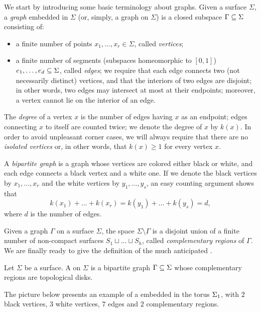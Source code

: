 We start by introducing some basic terminology about graphs. Given a surface $\Sigma$, a \emph{graph} embedded in $\Sigma$ (or, simply, a graph on $\Sigma$) is a closed subspace $\Gamma\subseteq\Sigma$ consisting of:
\begin{itemize}
\item a finite number of points $x_1,\ldots,x_r\in\Sigma$, called \emph{vertices};
\item a finite number of segments (subspaces homeomorphic to $[0,1]$) $e_1,\ldots,e_d\subseteq\Sigma$, called \emph{edges}; we require that each edge connects two (not necessarily distinct) vertices, and that the interiors of two edges are disjoint; in other words, two edges may intersect at most at their endpoints; moreover, a vertex cannot lie on the interior of an edge.
\end{itemize}
The \emph{degree} of a vertex $x$ is the number of edges having $x$ as an endpoint; edges connecting $x$ to itself are counted twice; we denote the degree of $x$ by $k(x)$. In order to avoid unpleasant corner cases, we will always require that there are no \emph{isolated vertices} or, in other words, that $k(x)\ge 1$ for every vertex $x$.

A \emph{bipartite graph} is a graph whose vertices are colored either black or white, and each edge connects a black vertex and a white one. If we denote the black vertices by $x_1,\ldots,x_r$ and the white vertices by $y_1,\ldots,y_s$, an easy counting argument shows that
\[
k(x_1)+\ldots+k(x_r)=k(y_1)+\ldots+k(y_s)=d,
\]
where $d$ is the number of edges.

Given a graph $\Gamma$ on a surface $\Sigma$, the space $\Sigma\setminus\Gamma$ is a disjoint union of a finite number of non-compact surfaces $S_1\sqcup\ldots\sqcup S_h$, called \emph{complementary regions} of $\Gamma$. We are finally ready to give the definition of the much anticipated \dessins{}.

\begin{definition}
Let $\Sigma$ be a surface. A \emph{\dessin{}} on $\Sigma$ is a bipartite graph $\Gamma\subseteq\Sigma$ whose complementary regions are topological disks.
\end{definition}

The picture below presents an example of a \dessin{} embedded in the torus $\Sigma_{1}$, with $2$ black vertices, $3$ white vertices, $7$ edges and $2$ complementary regions.

\begin{center}
\end{center}

